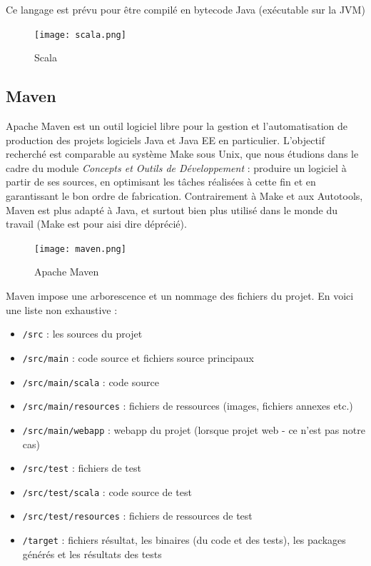 \documentclass[a4paper,11pt]{article}
\begin{document}
Ce langage est prévu pour être compilé en bytecode Java (exécutable sur la JVM)

	\begin{figure}[!ht]
		\center
		\texttt{[image: scala.png]}
		\caption{Scala}
	\end{figure}
	

\subsection{Maven}
Apache Maven est un outil logiciel libre pour la gestion et l'automatisation de production des projets logiciels Java et Java EE en particulier. L'objectif recherché est comparable au système Make sous Unix, que nous étudions dans le cadre du module \textit{Concepts et Outils de Développement} : produire un logiciel à partir de ses sources, en optimisant les tâches réalisées à cette fin et en garantissant le bon ordre de fabrication. Contrairement à Make et aux Autotools, Maven est plus adapté à Java, et surtout bien plus utilisé dans le monde du travail (Make est pour aisi dire déprécié).

	\begin{figure}[!ht]
		\center
		\texttt{[image: maven.png]}
		\caption{Apache Maven}
	\end{figure}

Maven impose une arborescence et un nommage des fichiers du projet. En voici une liste non exhaustive :
	\begin{itemize}
		\item \texttt{/src} : les sources du projet
		\item \texttt{/src/main} : code source et fichiers source principaux
		\item \texttt{/src/main/scala} : code source
		\item \texttt{/src/main/resources} : fichiers de ressources (images, fichiers annexes etc.)
		\item \texttt{/src/main/webapp} : webapp du projet (lorsque projet web - ce n'est pas notre cas)
		\item \texttt{/src/test} : fichiers de test
		\item \texttt{/src/test/scala} : code source de test
		\item \texttt{/src/test/resources} : fichiers de ressources de test
		\item \texttt{/target} : fichiers résultat, les binaires (du code et des tests), les packages générés et les résultats des tests
	\end{itemize}
	
\end{document}
